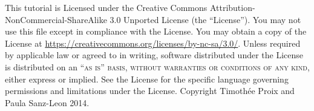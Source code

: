 \documentclass{tufte-handout}
\begin{document}
This tutorial is Licensed under the Creative Commons Attribution-NonCommercial-ShareAlike 3.0 Unported
License (the ``License''). You may not use this file except in compliance with
the License. You may obtain a copy of the License at \url{https://creativecommons.org/licenses/by-nc-sa/3.0/}. 
Unless required by applicable law or agreed to in writing, software distributed under the License
is distributed on an \textsc{``as is'' basis, without warranties or conditions
of any kind}, either express or implied. See the License for the specific
language governing permissions and limitations under the License.
Copyright Timothée Proix and Paula Sanz-Leon 2014.



\end{document}
